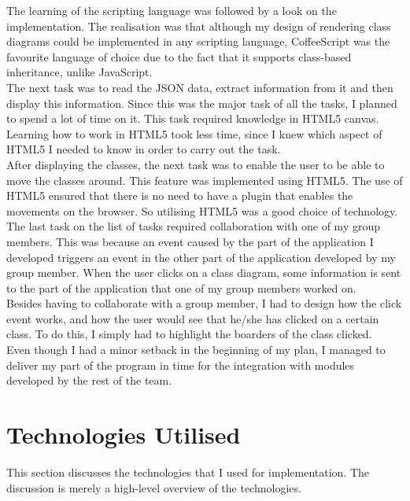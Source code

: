 \documentclass[titlepage,a4paper,11pt]{report}
\begin{document}
\indent The learning of the scripting language was followed by a look on the implementation. The realisation was that although my design of rendering class diagrams could be implemented in any scripting language, CoffeeScript was the favourite language of choice due to the fact that it supports class-based inheritance, unlike JavaScript.\\

\indent The next task was to read the JSON data, extract information from it and then display this information. Since this was the major task of all the tasks, I planned to spend a lot of time on it. This task required knowledge in HTML5 canvas. Learning how to work in HTML5 took less time, since I knew which aspect of HTML5 I needed to know in order to carry out the task. \\

\indent After displaying the classes, the next task was to enable the user to be able to move the classes around. This feature was implemented using HTML5. The use of HTML5 ensured that there is no need to have a plugin that enables the movements on the browser. So utilising HTML5 was a good choice of technology. \\

\indent The last task on the list of tasks required collaboration with one of my group members. This was because an event caused by the part of the application I developed triggers an event in the other part of the application developed by my group member. When the user clicks on a class diagram, some information is sent to the part of the application that one of my group members worked on. \\

\indent Besides having to collaborate with a group member, I had to design how the click event works, and how the user would see that he/she has clicked on a certain class. To do this, I simply had to highlight the boarders of the class clicked.\\

\indent Even though I had a minor setback in the beginning of my plan, I managed to deliver my part of the program in time for the integration with modules developed by the rest of the team.

\section{Technologies Utilised}
This section discusses the technologies that I used for implementation. The discussion is merely a high-level overview of the technologies.
\end{document}
